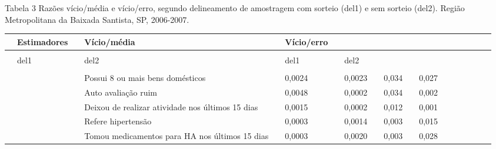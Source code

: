 \documentclass{article}
\begin{document}
Tabela 3%
Razões vício/média e vício/erro, segundo delineamento de amostragem com sorteio (del1) e sem sorteio (del2). Região Metropolitana da Baixada Santista, SP, 2006-2007.%
\begin{tabular}{| l | l | l | l | l | l || l | l | l | l || l | l | l | l | l | l | l | l |}
\hline
 & Estimadores & %
 & Vício/média & %
 & Vício/erro\\ \hline 
 & %
 & %
 & %
\\ \hline 
 & del1 & %
 & del2 & %
 & del1 & %
 & del2\\ \hline 
 & \multirow{1}{*}{\multicolumn{2}{l}{Adultos}}
 & %
 & 
 & %
 & 
 & %
 & 
\\ \hline 

 & 
 & %
 & Possui 8 ou mais bens domésticos
 & %
 & 0,0024
 & %
 & 0,0023
 & %
 & 0,034
 & %
 & 0,027
\\ \hline 

 & 
 & %
 & Auto avaliação ruim
 & %
 & 0,0048
 & %
 & 0,0002
 & %
 & 0,034
 & %
 & 0,002
\\ \hline 

 & 
 & %
 & Deixou de realizar atividade nos últimos 15 dias
 & %
 & 0,0015
 & %
 & 0,0002
 & %
 & 0,012
 & %
 & 0,001
\\ \hline 

 & 
 & %
 & Refere hipertensão
 & %
 & 0,0003
 & %
 & 0,0014
 & %
 & 0,003
 & %
 & 0,015
\\ \hline 

 & 
 & %
 & Tomou medicamentos para HA nos últimos 15 dias
 & %
 & 0,0003
 & %
 & 0,0020
 & %
 & 0,003
 & %
 & 0,028
\\ \hline 


\end{tabular}
\end{document}
